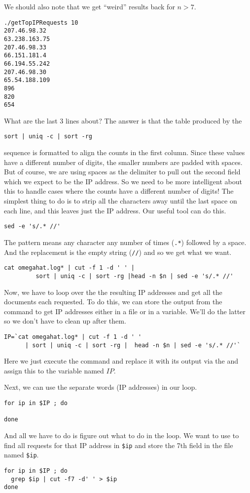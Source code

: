 \begin{enumerate}
We should also note that we get ``weird'' results back for $n > 7$.
\begin{verbatim}
./getTopIPRequests 10
207.46.98.32
63.238.163.75
207.46.98.33
66.151.181.4
66.194.55.242
207.46.98.30
65.54.188.109
896
820
654
\end{verbatim}
What are the last 3 lines about?
The answer is that the table produced by the
\begin{verbatim}
sort | uniq -c | sort -rg
\end{verbatim}
sequence is formatted to align the counts in the first column.
Since these values have a different number of digits,
the smaller numbers are padded with spaces.
But of course, we are using spaces as the delimiter
to pull out the second field which we expect to be
the IP address.
So we need to be more intelligent about this to handle
cases where the counts have a different number of digits!
The simplest thing to do is to strip all the characters
away until the last space on each line, and this leaves just the 
IP address.
Our useful tool  can do this.
\begin{verbatim}
sed -e 's/.* //'
\end{verbatim}
The pattern means any character any number of times (\verb+.*+)
followed by a space. And the replacement is the empty string
(\verb+//+) and so we get what we want.
\begin{verbatim}
cat omegahat.log* | cut -f 1 -d ' ' |
         sort | uniq -c | sort -rg |head -n $n | sed -e 's/.* //'
\end{verbatim}

Now, we have to loop over the the resulting IP addresses and
get all the documents each requested.
To do this, we can store the output from the command to get IP
addresses either in a file or in a variable.
We'll do the latter so we don't have to clean up after them.
\begin{verbatim}
IP=`cat omegahat.log* | cut -f 1 -d ' ' 
      | sort | uniq -c | sort -rg |  head -n $n | sed -e 's/.* //'`
\end{verbatim}
Here we just execute the command and replace it with its output via
the and assign this to the variable named $IP$.

Next, we can use the separate words (IP addresses) in our loop.
\begin{verbatim}
for ip in $IP ; do 

done
\end{verbatim}
And all we have to do is figure out what to do in the loop.
We want to use   to find all
requests for that IP address in \verb+$ip+ and store
the 7th field in the file named \verb+$ip+.
\begin{verbatim}
for ip in $IP ; do 
  grep $ip | cut -f7 -d' ' > $ip
done
\end{verbatim}
\end{enumerate}


